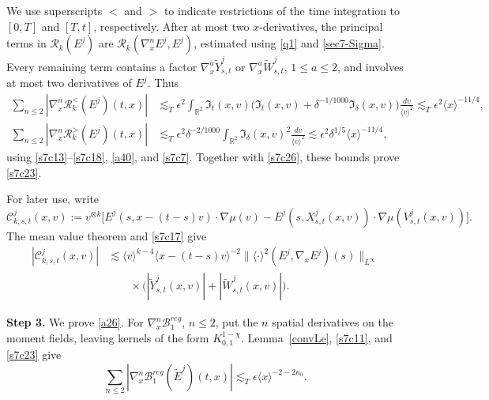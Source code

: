 \documentclass[reqno,11pt]{amsart}
\numberwithin{equation}{section}
\def\R{{\mathbb R}}
\def\R{{\bf R}}
\def\R{\mathbb{R}}
\begin{document}
We use superscripts $<$ and $>$ to indicate restrictions
of the time integration to $[0,T]$ and $[T,t]$, respectively.
After at most two $x$-derivatives, the principal terms in
$\mathcal R_k(E^j)$ are
$\mathcal R_k(\nabla_x^nE^j,E^j)$, estimated using
\eqref{q1} and \eqref{sec7-Sigma}.
Every remaining term contains a factor
$\nabla_x^a\widetilde Y^j_{s,t}$ or
$\nabla_x^a\widetilde W^j_{s,t}$, $1\leq a\leq2$,
and involves at most two derivatives of $E^j$.
Thus 
\begin{equation}\label{sec7-R-pieces}
\begin{split}
\sum_{n\leq2}|\nabla_x^n\mathcal R_k^<(E^j)(t,x)|
&\lesssim_T\epsilon^2\int_{\R^2}\mathfrak I_t(x,v)
\big(\mathfrak I_t(x,v)+\delta^{-1/1000}\mathfrak I_\delta(x,v)\big)
\frac{dv}{\langle v\rangle^2}\lesssim_T\epsilon^2\langle x\rangle^{-11/4},\\
\sum_{n\leq2}|\nabla_x^n\mathcal R_k^>(E^j)(t,x)|
&\lesssim_T\epsilon^2\delta^{-2/1000}
\int_{\R^2}\mathfrak I_\delta(x,v)^2
\frac{dv}{\langle v\rangle^2}\lesssim\epsilon^2\delta^{1/5}\langle x\rangle^{-11/4},
\end{split}
\end{equation}
using \eqref{s7c13}--\eqref{s7c18}, \eqref{a40}, and \eqref{s7c7}. Together with \eqref{s7c26}, these bounds prove \eqref{s7c23}.

For later use, write
\[
\mathcal C^j_{k,s,t}(x,v):=v^{\otimes k}
\big[E^j(s,x-(t-s)v)\cdot\nabla\mu(v)
-E^j(s,X^j_{s,t}(x,v))\cdot\nabla\mu(V^j_{s,t}(x,v))\big].
\]
The mean value theorem and \eqref{s7c17} give
\begin{equation}\label{s7c27}
\begin{split}
|\mathcal C^j_{k,s,t}(x,v)|
&\lesssim\langle v\rangle^{k-4}
\langle x-(t-s)v\rangle^{-2}
\|\langle\cdot\rangle^2(E^j,\nabla_xE^j)(s)\|_{L^\infty}\\
&\qquad\times
\big(|\widetilde Y^j_{s,t}(x,v)|
+|\widetilde W^j_{s,t}(x,v)|\big).
\end{split}
\end{equation}
\medskip

\textbf{Step 3.} We prove \eqref{a26}.
For $\nabla_x^n\mathcal B_1^{reg}$, $n\leq2$, put the
$n$ spatial derivatives on the moment fields, leaving kernels
of the form $K^{1-\chi}_{0,1}$.
Lemma~\ref{convLe}, \eqref{s7c11}, and \eqref{s7c23} give
\begin{equation}\label{s7c29}
\sum_{n\leq2}|\nabla_x^n\mathcal B_1^{reg}(\tilde E^j)(t,x)|
\lesssim_T\epsilon\langle x\rangle^{-2-2\kappa_0}.
\end{equation}
\end{document}
